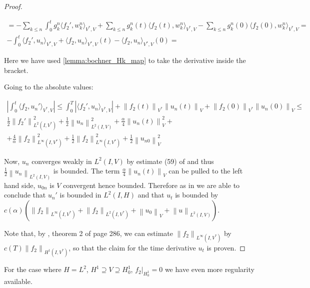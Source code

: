 \documentclass[english,a4paper,12pt,oneside]{scrbook}
\theoremstyle{break}
\newenvironment{mproof}[1][\proofname]{%
  \begin{proof}[#1]$ $\par\nobreak\ignorespaces
}{%
  \end{proof}
}
\renewcommand*{\proofname}{Proof}
\theoremstyle{remark}
\newcommand{\norm}[1]{\left\lVert#1\right\rVert}
\newcommand{\VN}[1]{\norm{#1}_{V}}
\newcommand{\VSN}[1]{\norm{#1}_{V^*}}
\begin{document}
\begin{mproof}
\begin{align*}
	 = - \sum_{k\leq n}\int_0^tg_k^{n}\langle f_2',w_k^n \rangle_{V^*,V} + \sum_{k\leq n} g_k^{n}(t)\langle f_2(t),w_k^n \rangle_{V^*,V} - \sum_{k\leq n} g_k^{n}(0)\langle f_2(0),w_k^n \rangle_{V^*,V} = \\
	 -\int_0^t \langle f_2',u_n \rangle_{V^*,V} + \langle f_2,u_n \rangle_{V^*,V}(t)-\langle f_2,u_n \rangle_{V^*,V}(0)=
\end{align*}

Here we have used \cref{lemma:bochner_Hk_map} to take the derivative inside the bracket.


Going to the absolute values:

\begin{align*}
	\left | \int_0^t \langle f_2,u_n' \rangle_{V^*,V}\right | \leq 
	\int_0^T |\langle f_2',u_n \rangle_{V^*,V}|+ \VSN{f_2(t)}\VN{u_n(t)}+\VSN{f_2(0)}\VN{u_n(0)} \leq \\
	\frac{1}{2}\norm{f_2'}_{L^2(I,V^*)}^2 + \frac{1}{2}\norm{u_n}_{L^2(I,V)}^2 + \frac{\alpha}{4}\VN{u_n(t)}^2 +\\
	+ \frac{4}{\alpha}\norm{f_2}_{L^\infty(I,V^*)}^2+ \frac{1}{2}\norm{f_2}_{L^\infty(I,V^*)}^2+\frac{1}{2}\VN{u_{n0}}^2
\end{align*}

Now, $u_n$ converges weakly in $L^2(I,V)$ by estimate (59) of \cite{gilardi} and thus $\frac{1}{2}\norm{u_n}_{L^2(I,V)}$ is bounded. The term $\frac{\alpha}{4}\VN{u_n(t)}$ can be pulled to the left hand side, $u_{0n}$ is $V$ convergent hence bounded. Therefore as in \cite{gilardi} we are able to conclude that $u_n'$ is bounded in $L^2(I,H)$ and that $u_t$ is bounded by $c(\alpha)(\norm{f_2}_{L^\infty(I,V^*)}+\norm{f_2}_{L^2(I,V^*)}+\VN{u_0}+\norm{u}_{L^2(I,V)})$.

Note that, by \cite{evans}, theorem 2 of page 286, we can estimate $\norm{f_2}_{L^\infty(I,V^*)}$ by $c(T)\norm{f_2}_{H^1(I,V^*)}$, so that the claim for the time derivative $u_t$ is proven.

\end{mproof}

For the case where $H=L^2$, $H^1\supseteq V\supseteq H^1_0$,  $f_2|_{H^1_0}=0$ we have even more regularity available.
\end{document}
